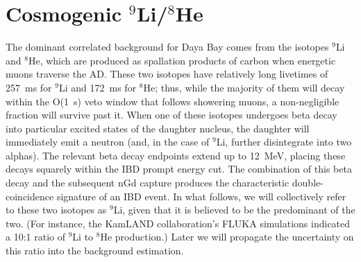 \documentclass[../thesis.tex]{subfiles}
\begin{document}
\begin{comment}
As previously stated, the accidental background can be straightforwardly measured based on the characteristics of singles events. The singles spectrum is first measured by searching for prompt-like events that satisfy the usual muon vetos but are separated from other prompt-like events by at least 400~$\mu$s. The total integral of this spectrum gives the prompt-like rate $R_p$, while the integral above 6~MeV gives the delayed-like rate $R_d$. The accidental background rate is then simply
\[ R_\mathrm{acc} = R_d(1 - e^{-R_p\Delta t})e^{-2R_p\Delta t}, \] where the factor in parentheses is the probability for a prompt-like single to fall within the $\Delta t$~=~200~$\mu$s preceding a delayed-like single, and the final factor is the probability that the event is \emph{not} rejected by the decoupled multiplicity cut, which disallows any additional prompt-like single in the 400~$\mu$s preceding the delayed event. Once the rate has been determined this way, the spectrum is trivial: It is simply the singles spectrum itself.
\end{comment}

\begin{comment}
  Mention IHEP's cross-check, and the additional uncertainty stemming from the difference between it and the nominal result?
\end{comment}

\section{Cosmogenic $^9$Li/$^8$He}
\label{sec:bkgCosmo}

\newcommand\linine{$^9$Li}

The dominant correlated background for Daya Bay comes from the isotopes $^9$Li and $^8$He, which are produced as spallation products of carbon when energetic muons traverse the AD. These two isotopes have relatively long livetimes of 257~ms for $^9$Li and 172~ms for $^8$He; thus, while the majority of them will decay within the O(1~s) veto window that follows showering muons, a non-negligible fraction will survive past it. When one of these isotopes undergoes beta decay into particular excited states of the daughter nucleus, the daughter will immediately emit a neutron (and, in the case of $^9$Li, further disintegrate into two alphas). The relevant beta decay endpoints extend up to 12~MeV, placing these decays squarely within the IBD prompt energy cut. The combination of this beta decay and the subsequent nGd capture produces the characteristic double-coincidence signature of an IBD event. In what follows, we will collectively refer to these two isotopes as $^9$Li, given that it is believed to be the predominant of the two. (For instance, the KamLAND collaboration's FLUKA simulations \cite{KamLAND_cosmo} indicated a 10:1 ratio of $^9$Li to $^8$He production.) Later we will propagate the uncertainty on this ratio into the background estimation. 
\end{document}
